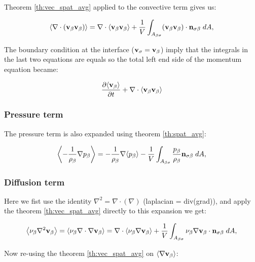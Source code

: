 Theorem \ref{th:vec_spat_avg} applied to the convective term gives us:

\begin{equation}
{\left< \nabla \cdot (\textbf{v}_{\beta}\textbf{v}_{\beta}) \right>} = \nabla \cdot {\left< \textbf{v}_{\beta}\textbf{v}_{\beta}\right>} + \dfrac{1}{V} \int_{A_{\beta \sigma}}  (\textbf{v}_{\beta} \textbf{v}_{\beta}) \cdot \mathbf{n}_{\sigma \beta} \;dA,
\end{equation}

The boundary condition at the interface ($\textbf{v}_{\sigma} = \textbf{v}_{\beta}$) imply that the integrals in the last two equations are equals so the total left end side of the momentum equation became:

\begin{equation}
\dfrac{\partial {\left< \textbf{v}_{\beta}\right>}}{\partial t} + \nabla \cdot {\left< \textbf{v}_{\beta}\textbf{v}_{\beta}\right>}
\label{eq:lhs}
\end{equation}

\subsubsection{Pressure term}
The pressure term is also expanded using theorem \ref{th:spat_avg}:

\begin{equation}
{\left< -\dfrac{1}{\rho_{\beta}} \nabla p_{\beta}\right>} = -\dfrac{1}{\rho_{\beta}} \nabla {\left< p_{\beta}\right>} -\dfrac{1}{V} \int_{A_{\beta \sigma}} \dfrac{p_{\beta}}{\rho_{\beta}} \mathbf{n}_{\sigma \beta} \;dA,
\end{equation}

\subsubsection{Diffusion term}
Here we fist use the identity $\nabla^2 = \nabla \cdot (\nabla)$ (laplacian = div(grad)), and apply the theorem \ref{th:vec_spat_avg} directly to this expansion we get:

\begin{equation}
{\left< \nu_{\beta}\nabla^2 \textbf{v}_{\beta}\right>} = {\left< \nu_{\beta}\nabla \cdot \nabla \textbf{v}_{\beta} \right>} = \nabla \cdot {\left< \nu_{\beta}\nabla \textbf{v}_{\beta}\right>} +\dfrac{1}{V} \int_{A_{\beta \sigma}}  \nu_{\beta} \nabla \textbf{v}_{\beta} \cdot \mathbf{n}_{\sigma \beta} \;dA,
\label{eq:4_1}
\end{equation}

Now re-using the theorem \ref{th:vec_spat_avg} on ${\left< \nabla \textbf{v}_{\beta} \right>}$:

